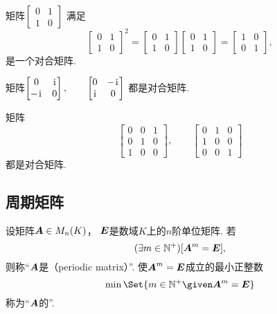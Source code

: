\begin{example}
矩阵\begin{math}
	\begin{bmatrix}
		0 & 1 \\
		1 & 0
	\end{bmatrix}
\end{math}
满足\[
	\begin{bmatrix}
		0 & 1 \\
		1 & 0
	\end{bmatrix}^2
	=
	\begin{bmatrix}
		0 & 1 \\
		1 & 0
	\end{bmatrix}
	\begin{bmatrix}
		0 & 1 \\
		1 & 0
	\end{bmatrix}
	= \begin{bmatrix}
		1 & 0 \\
		0 & 1
	\end{bmatrix},
\]是一个对合矩阵.
\end{example}
\begin{example}
矩阵\begin{math}
	\begin{bmatrix}
		0 & \kern1pt\mathrm{i}\kern1pt \\
		-\kern1pt\mathrm{i}\kern1pt & 0
	\end{bmatrix},
	\qquad
	\begin{bmatrix}
		0 & -\kern1pt\mathrm{i}\kern1pt \\
		\kern1pt\mathrm{i}\kern1pt & 0
	\end{bmatrix}
\end{math}
都是对合矩阵.
\end{example}
\begin{example}
矩阵\[
	\begin{bmatrix}
		0 & 0 & 1 \\
		0 & 1 & 0 \\
		1 & 0 & 0
	\end{bmatrix},
	\qquad
	\begin{bmatrix}
		0 & 1 & 0 \\
		1 & 0 & 0 \\
		0 & 0 & 1
	\end{bmatrix}
\]都是对合矩阵.
\end{example}

\subsection{周期矩阵}
\begin{definition}
设矩阵\(\boldsymbol{A} \in M_n(K)\)，
\(\boldsymbol{E}\)是数域\(K\)上的\(n\)阶单位矩阵.
若\[
	(\exists m\in\mathbb{N}^+)
	[\boldsymbol{A}^m = \boldsymbol{E}],
\]
则称“\(\boldsymbol{A}\)是（periodic matrix）”.
使\(\boldsymbol{A}^m = \boldsymbol{E}\)成立的最小正整数\[
	\min\Set{ m\in\mathbb{N}^+ \given \vb{A}^m = \vb{E} }
\]称为“\(\boldsymbol{A}\)的”.
\end{definition}

